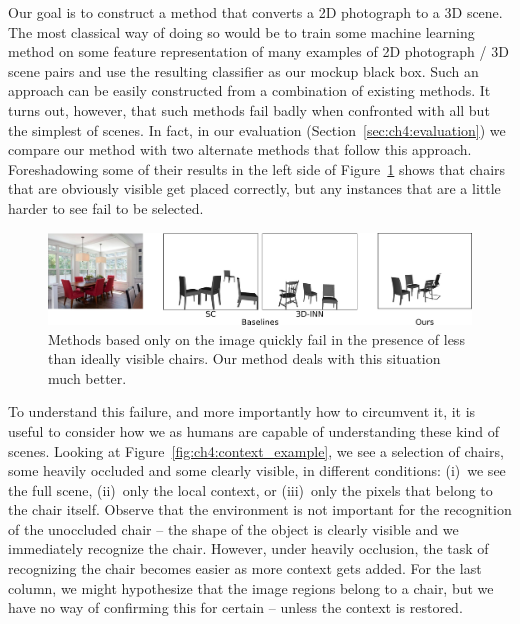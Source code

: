 \documentclass[10pt,twocolumn,letterpaper]{article}
\begin{document}
Our goal is to construct a method that
converts a 2D photograph to a 3D scene.  The most classical
way of doing so would be to train some machine learning method on some feature
representation of many examples of 2D photograph / 3D scene pairs and use the
resulting classifier as our mockup black box. Such an approach can be easily
constructed from a combination of existing methods. It turns out, however, that
such methods fail badly when confronted with all but the simplest of scenes.
In fact, in our evaluation (Section~\ref{sec:ch4:evaluation}) we compare our
method with two alternate methods that follow this approach. Foreshadowing some of
their results in the left side of Figure~\ref{fig:ch4:baseline_foreshadowing}
shows that chairs that are obviously visible get placed correctly, but any
instances that are a little harder to see fail to be selected.

\begin{figure}[h!]
    \includegraphics[width=\linewidth]{figures/baseline_foreshadowing/baseline_foreshadowing}
    \caption[Baseline sample]{Methods based only on the image quickly fail in the presence of less than ideally visible chairs. Our method deals with this situation much better.}
    \label{fig:ch4:baseline_foreshadowing}
\end{figure}


To understand this failure, and more importantly how to circumvent it, it is
useful to consider how we as humans are capable of understanding these kind of
scenes. Looking at Figure~\ref{fig:ch4:context_example}, we see a selection of chairs, some
heavily occluded and some clearly visible, in different conditions: (i)~we see the full scene, (ii)~only the local context, or (iii)~only  the pixels that belong to the chair
itself. Observe that the
environment is not important for the recognition of the unoccluded chair  -- the shape of the object is clearly visible and
we immediately recognize the chair. However, under heavily occlusion, the
task of recognizing the chair becomes easier as more context gets added. For
the last column, we might hypothesize that the image regions belong to a chair,
but we have no way of confirming this for certain -- unless the context is
restored.
\end{document}
